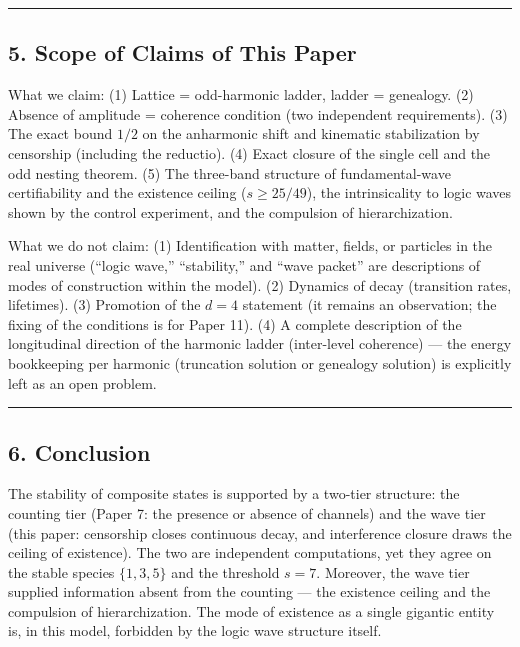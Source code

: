 \documentclass[
]{article}
\begin{document}
\begin{center}\rule{0.5\linewidth}{0.5pt}\end{center}

\subsection{5. Scope of Claims of This
Paper}\label{scope-of-claims-of-this-paper}

What we claim: (1) Lattice = odd-harmonic ladder, ladder = genealogy.
(2) Absence of amplitude = coherence condition (two independent
requirements). (3) The exact bound \(1/2\) on the anharmonic shift and
kinematic stabilization by censorship (including the reductio). (4)
Exact closure of the single cell and the odd nesting theorem. (5) The
three-band structure of fundamental-wave certifiability and the
existence ceiling (\(s\ge25/49\)), the intrinsicality to logic waves
shown by the control experiment, and the compulsion of hierarchization.

What we do not claim: (1) Identification with matter, fields, or
particles in the real universe (``logic wave,'' ``stability,'' and
``wave packet'' are descriptions of modes of construction within the
model). (2) Dynamics of decay (transition rates, lifetimes). (3)
Promotion of the \(d=4\) statement (it remains an observation; the
fixing of the conditions is for Paper 11). (4) A complete description of
the longitudinal direction of the harmonic ladder (inter-level
coherence) --- the energy bookkeeping per harmonic (truncation solution
or genealogy solution) is explicitly left as an open problem.

\begin{center}\rule{0.5\linewidth}{0.5pt}\end{center}

\subsection{6. Conclusion}\label{conclusion}

The stability of composite states is supported by a two-tier structure:
the counting tier (Paper 7: the presence or absence of channels) and the
wave tier (this paper: censorship closes continuous decay, and
interference closure draws the ceiling of existence). The two are
independent computations, yet they agree on the stable species
\(\{1,3,5\}\) and the threshold \(s=7\). Moreover, the wave tier
supplied information absent from the counting --- the existence ceiling
and the compulsion of hierarchization. The mode of existence as a single
gigantic entity is, in this model, forbidden by the logic wave structure
itself.
\end{document}
